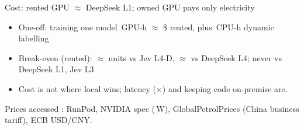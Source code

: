 \begin{frame}{Cost: rented GPU $\approx$ DeepSeek L1; owned GPU pays only electricity}
  \raggedright
  \begin{itemize}\footnotesize
    \item One-off: training one model \,GPU-h $\approx$ \$ rented, plus \,CPU-h dynamic labelling
    \item Break-even (rented): $\approx$ units vs Jev L4-D, $\approx$ vs DeepSeek L4; never vs DeepSeek L1, Jev L3
    \item \alert{Cost is not where local wins; latency ($\times$) and keeping code on-premise are.}
  \end{itemize}
  {\fontsize{7}{8}\selectfont\color{NeutDraw} Prices accessed : RunPod, NVIDIA spec (\,W), GlobalPetrolPrices (China business tariff), ECB  USD/CNY.\par}
\end{frame}

